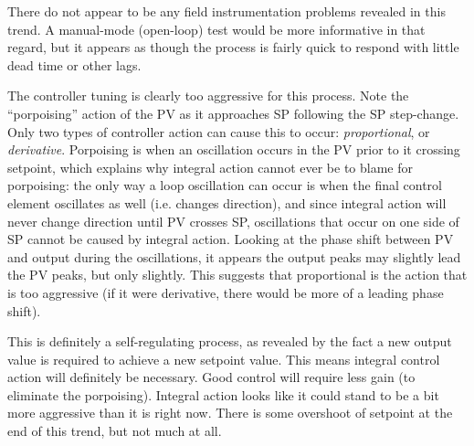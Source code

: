 \vskip 10pt

There do not appear to be any field instrumentation problems revealed in this trend.  A manual-mode (open-loop) test would be more informative in that regard, but it appears as though the process is fairly quick to respond with little dead time or other lags.

\vskip 10pt
  
The controller tuning is clearly too aggressive for this process.  Note the ``porpoising'' action of the PV as it approaches SP following the SP step-change.  Only two types of controller action can cause this to occur: {\it proportional}, or {\it derivative}.  Porpoising is when an oscillation occurs in the PV prior to it crossing setpoint, which explains why integral action cannot ever be to blame for porpoising: the only way a loop oscillation can occur is when the final control element oscillates as well (i.e. changes direction), and since integral action will never change direction until PV crosses SP, oscillations that occur on one side of SP cannot be caused by integral action.  Looking at the phase shift between PV and output during the oscillations, it appears the output peaks may slightly lead the PV peaks, but only slightly.  This suggests that proportional is the action that is too aggressive (if it were derivative, there would be more of a leading phase shift).

\vskip 10pt

This is definitely a self-regulating process, as revealed by the fact a new output value is required to achieve a new setpoint value.  This means integral control action will definitely be necessary.  Good control will require less gain (to eliminate the porpoising).  Integral action looks like it could stand to be a bit more aggressive than it is right now.  There is some overshoot of setpoint at the end of this trend, but not much at all.











